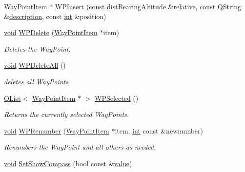 \begin{DoxyCompactItemize}
\hyperlink{classmapcontrol_1_1_way_point_item}{Way\-Point\-Item} $\ast$ \hyperlink{group___o_p_map_widget_gaf16670bc38e8aca978582a35732e2e6b}{W\-P\-Insert} (const \hyperlink{structmapcontrol_1_1dist_bearing_altitude}{dist\-Bearing\-Altitude} \&relative, const \hyperlink{group___u_a_v_objects_plugin_gab9d252f49c333c94a72f97ce3105a32d}{Q\-String} \&\hyperlink{sdlgamepad_8dox_ae82208d022e4246ddf1e4f481a3f81b0}{description}, const \hyperlink{ioapi_8h_a787fa3cf048117ba7123753c1e74fcd6}{int} \&position)
\item 
\hyperlink{group___u_a_v_objects_plugin_ga444cf2ff3f0ecbe028adce838d373f5c}{void} \hyperlink{group___o_p_map_widget_gacb242b413e111fc504749bdfacc16fd2}{W\-P\-Delete} (\hyperlink{classmapcontrol_1_1_way_point_item}{Way\-Point\-Item} $\ast$item)
\begin{DoxyCompactList}\small\item\em Deletes the Way\-Point. \end{DoxyCompactList}\item 
\hyperlink{group___u_a_v_objects_plugin_ga444cf2ff3f0ecbe028adce838d373f5c}{void} \hyperlink{group___o_p_map_widget_ga2dd5bd06f443a496f6f81464ef44b614}{W\-P\-Delete\-All} ()
\begin{DoxyCompactList}\small\item\em deletes all Way\-Points \end{DoxyCompactList}\item 
\hyperlink{class_q_list}{Q\-List}$<$ \hyperlink{classmapcontrol_1_1_way_point_item}{Way\-Point\-Item} $\ast$ $>$ \hyperlink{group___o_p_map_widget_ga6051fad972405dd8b2a27196b4569684}{W\-P\-Selected} ()
\begin{DoxyCompactList}\small\item\em Returns the currently selected Way\-Points. \end{DoxyCompactList}\item 
\hyperlink{group___u_a_v_objects_plugin_ga444cf2ff3f0ecbe028adce838d373f5c}{void} \hyperlink{group___o_p_map_widget_gaba5ee1743df3dee15e552f21a0c5d141}{W\-P\-Renumber} (\hyperlink{classmapcontrol_1_1_way_point_item}{Way\-Point\-Item} $\ast$item, \hyperlink{ioapi_8h_a787fa3cf048117ba7123753c1e74fcd6}{int} const \&newnumber)
\begin{DoxyCompactList}\small\item\em Renumbers the Way\-Point and all others as needed. \end{DoxyCompactList}\item 
\hyperlink{group___u_a_v_objects_plugin_ga444cf2ff3f0ecbe028adce838d373f5c}{void} \hyperlink{group___o_p_map_widget_ga6f97b86b2d7a7ca6f5b7bb65a70b5a96}{Set\-Show\-Compass} (bool const \&\hyperlink{glext_8h_aa0e2e9cea7f208d28acda0480144beb0}{value})

\end{DoxyCompactItemize}

